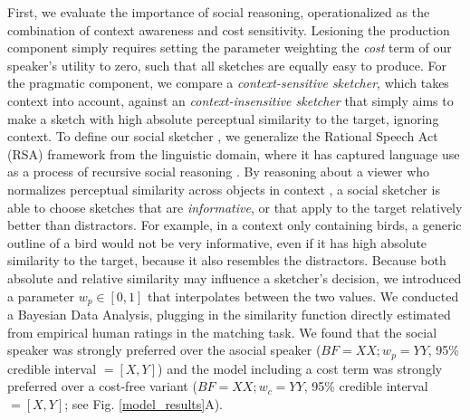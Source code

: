 \documentclass[9pt,twocolumn,twoside]{pnas-new}
\newcommand{\mwu}[1]{{\color{green}{[mwu: #1]}}}
\begin{document}
First, we evaluate the importance of social reasoning, operationalized as the combination of context awareness and cost sensitivity.\mwu{define, and maybe italicize.}
Lesioning the production component simply requires setting the parameter \mwu{what are the parameters? say that the neuralnet has parameters, the bayesian model does too? it would be good to have the objective formula prior to this section.} weighting the \emph{cost} term of our speaker's utility to zero, such that all sketches are equally easy to produce. For the pragmatic component, we compare a \emph{context-sensitive sketcher}, which takes context into account, against an \emph{context-insensitive sketcher} that simply aims to make a sketch with high absolute perceptual similarity to the target, ignoring context. To define our social sketcher \mwu{which of the two sketchers u defined is the social sketcher?}, we generalize the Rational Speech Act (RSA) framework from the linguistic domain, where it has captured language use as a process of recursive social reasoning \cite{goodman2016pragmatic,kao2014formalizing,goodman2013knowledge}. \mwu{do we not need to define RSA somewhere?} By reasoning about a viewer who normalizes \mwu{what normalization?} perceptual similarity across objects in context \mwu{a rigorous definition of context is important}, a social sketcher is able to choose sketches that are \emph{informative}, or that apply to the target relatively better than distractors. For example, in a context only containing birds, a generic outline of a bird would not be very informative, even if it has high absolute similarity to the target, because it also resembles the distractors. Because both absolute and relative similarity may influence a sketcher's decision, we introduced a parameter $w_p \in [0,1]$ that interpolates between the two values.\mwu{again, writing out the loss function might help.} We conducted a Bayesian Data Analysis, plugging in the similarity function directly estimated from empirical human ratings in the matching task. We found that the social speaker was strongly preferred over the asocial speaker ($BF = XX; w_p = YY$, 95\% credible interval $= [X, Y]$) and the model including a cost term was strongly preferred over a cost-free variant ($BF = XX; w_c = YY$, 95\% credible interval $=[X, Y]$; see Fig. \ref{model_results}A).\mwu{do we ever say that cost governs stroke number?}
\mwu{what is BDA? why do we care about BF? Give some intuition on if these values are good or bad?}
\end{document}
